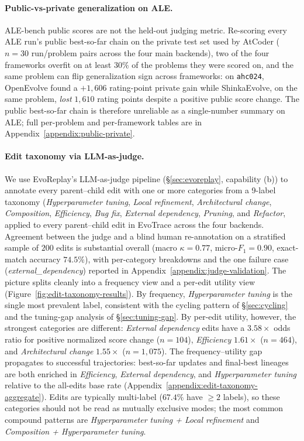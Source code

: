 \paragraph{Public-vs-private generalization on ALE.}
ALE-bench public scores are not the held-out judging metric. Re-scoring every ALE run's public best-so-far chain on the private test set used by AtCoder ($n{=}30$ run/problem pairs across the four main backends), two of the four frameworks overfit on at least $30\%$ of the problems they were scored on, and the same problem can flip generalization sign across frameworks: on \texttt{ahc024}, OpenEvolve found a $+1{,}606$ rating-point private gain while ShinkaEvolve, on the same problem, \emph{lost} $1{,}610$ rating points despite a positive public score change. The public best-so-far chain is therefore unreliable as a single-number summary on ALE; full per-problem and per-framework tables are in Appendix~\ref{appendix:public-private}.

\paragraph{Edit taxonomy via LLM-as-judge.}
We use EvoReplay's LLM-as-judge pipeline (\S\ref{sec:evoreplay}, capability (b)) to annotate every parent--child edit with one or more categories from a 9-label taxonomy (\emph{Hyperparameter tuning}, \emph{Local refinement}, \emph{Architectural change}, \emph{Composition}, \emph{Efficiency}, \emph{Bug fix}, \emph{External dependency}, \emph{Pruning}, and \emph{Refactor}, applied to every parent--child edit in EvoTrace across the four backends. Agreement between the judge and a blind human re-annotation on a stratified sample of $200$ edits is substantial overall (macro $\kappa = 0.77$, micro-$F_1 = 0.90$, exact-match accuracy $74.5\%$), with per-category breakdowns and the one failure case (\emph{external\_dependency}) reported in Appendix~\ref{appendix:judge-validation}. The picture splits cleanly into a frequency view and a per-edit utility view (Figure~\ref{fig:edit-taxonomy-results}).
By frequency, \emph{Hyperparameter tuning} is the single most prevalent label, consistent with the cycling pattern of \S\ref{sec:cycling} and the tuning-gap analysis of \S\ref{sec:tuning-gap}. By per-edit utility, however, the strongest categories are different: \emph{External dependency} edits have a $3.58\times$ odds ratio for positive normalized score change ($n{=}104$), \emph{Efficiency} $1.61\times$ ($n{=}464$), and \emph{Architectural change} $1.55\times$ ($n{=}1{,}075$).
The frequency--utility gap propagates to successful trajectories: best-so-far updates and final-best lineages are both enriched in \emph{Efficiency}, \emph{External dependency}, and \emph{Hyperparameter tuning} relative to the all-edits base rate (Appendix~\ref{appendix:edit-taxonomy-aggregate}). Edits are typically multi-label ($67.4\%$ have $\geq 2$ labels), so these categories should not be read as mutually exclusive modes; the most common compound patterns are \emph{Hyperparameter tuning + Local refinement} and \emph{Composition + Hyperparameter tuning}.


